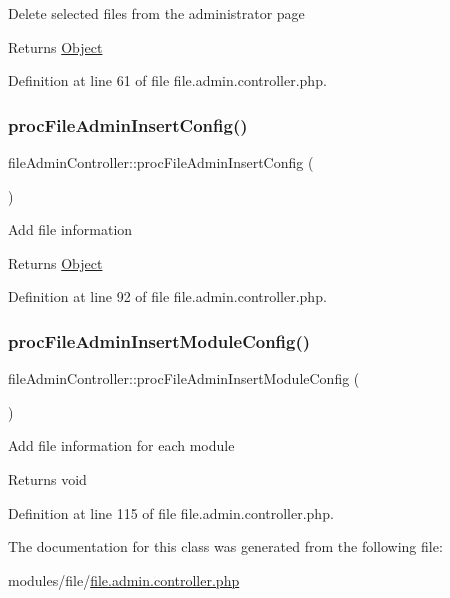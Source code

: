 Delete selected files from the administrator page

\begin{DoxyReturn}{Returns}
\hyperlink{classObject}{Object} 
\end{DoxyReturn}


Definition at line 61 of file file.\+admin.\+controller.\+php.

\mbox{\label{classfileAdminController_a03889846de03ed7142320ef12aed5eda}} 
\subsubsection{\texorpdfstring{proc\+File\+Admin\+Insert\+Config()}{procFileAdminInsertConfig()}}
{\footnotesize\ttfamily file\+Admin\+Controller\+::proc\+File\+Admin\+Insert\+Config (\begin{DoxyParamCaption}{ }\end{DoxyParamCaption})}

Add file information

\begin{DoxyReturn}{Returns}
\hyperlink{classObject}{Object} 
\end{DoxyReturn}


Definition at line 92 of file file.\+admin.\+controller.\+php.

\mbox{\label{classfileAdminController_af0fc824e9379d6c2fdd55c7b7444c317}} 
\subsubsection{\texorpdfstring{proc\+File\+Admin\+Insert\+Module\+Config()}{procFileAdminInsertModuleConfig()}}
{\footnotesize\ttfamily file\+Admin\+Controller\+::proc\+File\+Admin\+Insert\+Module\+Config (\begin{DoxyParamCaption}{ }\end{DoxyParamCaption})}

Add file information for each module

\begin{DoxyReturn}{Returns}
void 
\end{DoxyReturn}


Definition at line 115 of file file.\+admin.\+controller.\+php.



The documentation for this class was generated from the following file\+:\begin{DoxyCompactItemize}
\item 
modules/file/\hyperlink{file_8admin_8controller_8php}{file.\+admin.\+controller.\+php}\end{DoxyCompactItemize}
